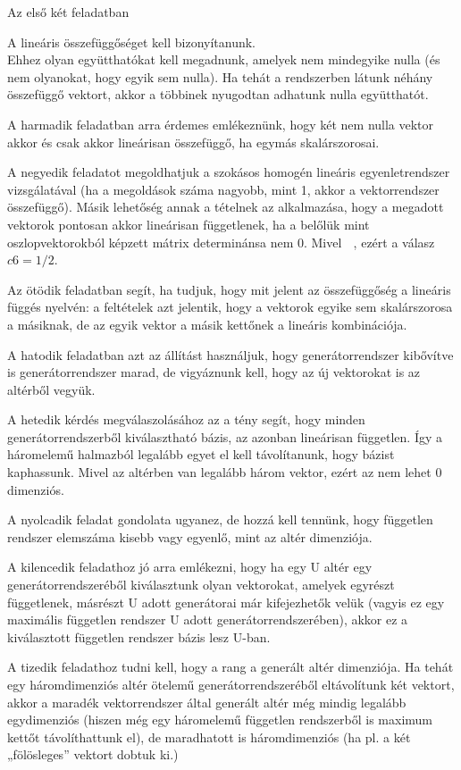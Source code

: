 \begin{frame}
  \begin{tcolorbox}[title={3/11. -Q-}]
Az első két feladatban 

A lineáris összefüggőséget kell bizonyítanunk.\\
Ehhez olyan együtthatókat kell megadnunk, amelyek nem mindegyike nulla (és nem olyanokat, hogy egyik sem nulla). Ha tehát a rendszerben látunk néhány összefüggő vektort, akkor a többinek nyugodtan adhatunk nulla együtthatót.

A harmadik feladatban arra érdemes emlékeznünk, hogy két nem nulla vektor akkor és csak akkor lineárisan összefüggő, ha egymás skalárszorosai.

A negyedik feladatot megoldhatjuk a szokásos homogén lineáris egyenletrendszer vizsgálatával (ha a megoldások száma nagyobb, mint 1, akkor a vektorrendszer összefüggő). Másik lehetőség annak a tételnek az alkalmazása, hogy a megadott vektorok pontosan akkor lineárisan függetlenek, ha a belőlük mint oszlopvektorokból képzett mátrix determinánsa nem 0. Mivel

, ezért a válasz $c 6= 1/2$. 

Az ötödik feladatban segít, ha tudjuk, hogy mit jelent az összefüggőség a lineáris függés nyelvén: a feltételek azt jelentik, hogy a vektorok egyike sem skalárszorosa a másiknak, de az egyik vektor a másik kettőnek a lineáris kombinációja. 

A hatodik feladatban azt az állítást használjuk, hogy generátorrendszer kibővítve is generátorrendszer marad, de vigyáznunk kell, hogy az új vektorokat is az altérből vegyük. 

A hetedik kérdés megválaszolásához az a tény segít, hogy minden generátorrendszerből kiválasztható bázis, az azonban lineárisan független. Így a háromelemű halmazból legalább egyet el kell távolítanunk, hogy bázist kaphassunk. Mivel az altérben van legalább három vektor, ezért az nem lehet 0 dimenziós. 

A nyolcadik feladat gondolata ugyanez, de hozzá kell tennünk, hogy független rendszer elemszáma kisebb vagy egyenlő, mint az altér dimenziója. 

A kilencedik feladathoz jó arra emlékezni, hogy ha egy U altér egy generátorrendszeréből kiválasztunk olyan vektorokat, amelyek egyrészt függetlenek, másrészt U adott generátorai már kifejezhetők velük (vagyis ez egy maximális független rendszer U adott generátorrendszerében), akkor ez a kiválasztott független rendszer bázis lesz U-ban.

A tizedik feladathoz tudni kell, hogy a rang a generált altér dimenziója. Ha tehát egy háromdimenziós altér ötelemű generátorrendszeréből eltávolítunk két vektort, akkor a maradék vektorrendszer által generált altér még mindig legalább egydimenziós (hiszen még egy háromelemű független rendszerből is maximum kettőt távolíthattunk el), de maradhatott is háromdimenziós (ha pl. a két „fölösleges” vektort dobtuk ki.) 


\end{tcolorbox}
\end{frame}
